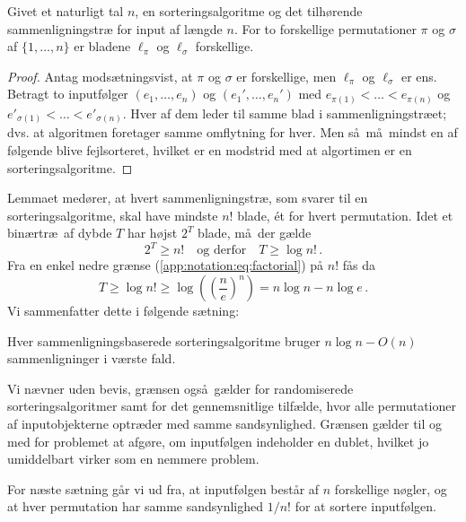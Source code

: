\begin{lemma} 
  Givet et naturligt tal $n$, en sorteringsalgoritme og det tilhørende sammenligningstræ for input af længde $n$.
  For to forskellige permutationer $\pi$ og $\sigma$ af $\{1,\ldots, n\}$ er bladene $\ell_\pi$ og $\ell_\sigma$ forskellige.
\end{lemma}

\begin{proof}
  Antag modsætningsvist, at $\pi$ og $\sigma$ er forskellige, men $\ell_\pi$ og $\ell_\sigma$ er ens.
  Betragt to inputfølger $(e_1,\ldots,e_n)$ og $(e_1',\ldots,e_n')$ med $e_{\pi(1)} <  \ldots < e_{\pi(n)}$ og $e'_{\sigma(1)} <  \ldots < e'_{\sigma(n)}$.
  Hver af dem leder til samme blad i sammenligningstræet; dvs. at algoritmen foretager samme omflytning for hver.
  Men så må mindst en af følgende blive fejlsorteret, hvilket er en modstrid med at algortimen er en sorteringsalgoritme.
\end{proof}

Lemmaet medører, at hvert sammenligningstræ, som svarer til en sorteringsalgoritme, skal have mindste $n!$ blade, ét for hvert permutation.
Idet et binærtræ af dybde $T$ har højst $2^T$ blade, må der gælde
\[ 2^T \ge n!  \quad\text{og derfor}\quad T \ge \log n!\,.  \]
Fra en enkel nedre grænse (\ref{app:notation:eq:factorial}) på $n!$ fås da
\[ T\geq \log n!\geq \log \left(\left(\frac{n}{e}\right)^n\right)=n\log n - n\log e \,.\]
Vi sammenfatter dette i følgende sætning:

\begin{thm}
  Hver sammenligningsbaserede sorteringsalgoritme bruger $n\log n-O(n)$ sammenligninger i værste fald.
\end{thm}

Vi nævner uden bevis, grænsen også gælder for randomiserede sorteringsalgoritmer 
%
%
samt for det gennemsnitlige tilfælde, hvor alle permutationer af input\-objekterne optræder med samme sandsynlighed.
Grænsen gælder til og med for problemet at afgøre, om input\-følgen indeholder en dublet, hvilket jo umiddelbart virker som en nemmere problem.

For næste sætning går vi ud fra, at input\-følgen består af $n$ forskellige nøgler, og at hver permutation har samme sandsynlighed $1/n!$ for at sortere input\-følgen.

